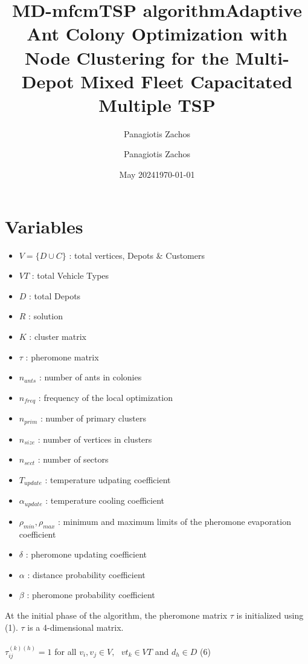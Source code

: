 \documentclass[twocolumn]{article}
\title{MD-mfcmTSP algorithm}
\author{Panagiotis Zachos}
\date{May 2024}
\begin{document}
	
	\title{Adaptive Ant Colony Optimization with Node Clustering for the Multi-Depot Mixed Fleet Capacitated Multiple TSP}
	\author{Panagiotis Zachos}
	\date{\today}
	
	\maketitle

		
	\section{Variables}
		
	\begin{itemize}
		\item $V = \{D\cup C\}$ : total vertices, Depots \& Customers\
		\item $VT$ : total Vehicle Types\
		\item $D$ : total Depots\
		\item $R$ : solution\
		\item $K$ : cluster matrix\
		\item $\tau$ : pheromone matrix
		\item $n_{ants}$ : number of ants in colonies\
		\item $n_{freq}$ : frequency of the local optimization\
		\item $n_{prim}$ : number of primary clusters\
		\item $n_{size}$ : number of vertices in clusters\
		\item $n_{sect}$ : number of sectors\
		\item $T_{update}$ : temperature udpating coefficient\
		\item $\alpha_{update}$ : temperature cooling coefficient\
		\item  $\rho_{min}, \rho_{max}$ : minimum and maximum limits of the pheromone evaporation coefficient\ 
		\item  $\delta$ : pheromone updating coefficient\
		\item $\alpha$ : distance probability coefficient\
		\item $\beta$ : pheromone probability coefficient\\
	\end{itemize}
	At the initial phase of the algorithm, the pheromone matrix $\tau$ is initialized using (1). $\tau$ is a 4-dimensional matrix.\\\\
	$\tau_{ij}^{(k)(h)} = 1$ for all $v_i, v_j\in V, \text{ }vt_k\in VT$ and $d_h\in D$ (6)\\\\
\end{document}
